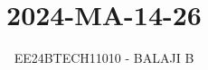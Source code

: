 \documentclass[journal]{IEEEtran}
\begin{document}

\vspace{3cm}

\title{2024-MA-14-26}
\author{EE24BTECH11010 - BALAJI B}
{\let\newpage\relax\maketitle}

\renewcommand{\thefigure}{\theenumi}
\renewcommand{\thetable}{\theenumi}
\setlength{\intextsep}{10pt} %


\renewcommand{\thetable}{\theenumi}
\end{document}
